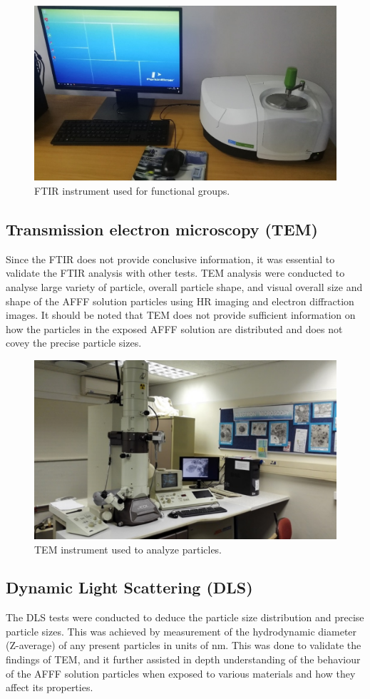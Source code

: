 \documentclass[12pt]{report}
\begin{document}
\begin{figure}[H]
    \includegraphics[width=.6\textwidth]{ftir_instrument.jpg}
    \caption{FTIR instrument used for functional groups.}
    \label{ch4:figure:ftir}
\end{figure}

\subsection{Transmission electron microscopy (TEM)}
Since the FTIR does not provide conclusive information, it was essential to validate the FTIR analysis with other tests. TEM analysis were conducted to analyse large variety of particle, overall particle shape, and visual overall size and shape of the AFFF solution particles using HR imaging and electron diffraction images. It should be noted that TEM does not provide sufficient information on how the particles in the exposed AFFF solution are distributed and does not covey the precise particle sizes. 
 
\begin{figure}[H]
    \includegraphics[width=.6\textwidth]{tem_instrument.png}
    \caption{TEM instrument used to analyze particles.}
    \label{ch4:figure:tem}
\end{figure}

\subsection{Dynamic Light Scattering (DLS)}
The DLS tests were conducted to deduce the particle size distribution and precise particle sizes. This was achieved by measurement of the hydrodynamic diameter (Z-average) of any present particles in units of nm. This was done to validate the findings of TEM, and it further assisted in depth understanding of the behaviour of the AFFF solution particles when exposed to various materials and how they affect its properties.  
 
\end{document}
